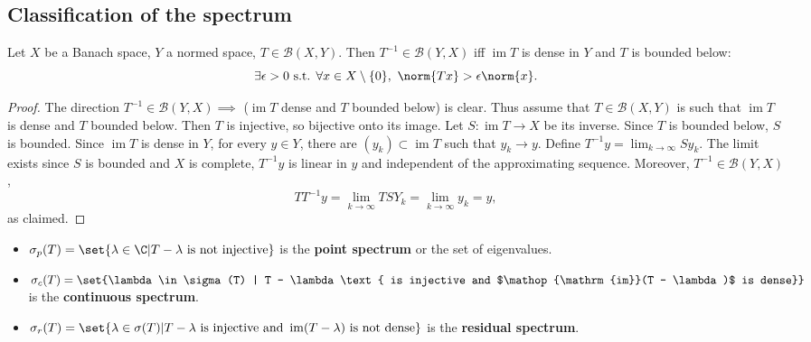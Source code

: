 \documentclass{article}
\DeclareMathOperator{\im}{im}
\begin{document}
\subsection{Classification of the spectrum}
\begin{prop}
    Let $X$ be a Banach space, $Y$ a normed space, $T \in \mathcal{B}(X,Y)$.
    Then $T^{-1} \in \mathcal{B}(Y,X)$ iff $\im T$ is dense in $Y$ and $T$ is bounded below:
    \begin{equation*}
        \exists \epsilon > 0 \text{ s.t. } \forall x \in X \setminus \{0\}, \ \norm{T x} > \epsilon \norm{x}.
    \end{equation*}
\end{prop}

\begin{proof}
    The direction $T^{-1} \in \mathcal{B}(Y, X) \implies$ ($\im T$ dense and $T$ bounded below) is clear.
    Thus assume that $T \in \mathcal{B}(X, Y)$ is such that $\im T$ is dense and $T$ bounded below.
    Then $T$ is injective, so bijective onto its image.
    Let $S: \im T \to X$ be its inverse.
    Since $T$ is bounded below, $S$ is bounded.
    Since $\im T$ is dense in $Y$, for every $y \in Y$, there are $(y_k) \subset \im T$ such that $y_k \to y$.
    Define $T^{-1} y = \lim_{k \to \infty} Sy_k$.
    The limit exists since $S$ is bounded and $X$ is complete, $T^{-1} y$ is linear in $y$ and independent of the approximating sequence.
    Moreover, $T^{-1} \in \mathcal{B}(Y, X)$,
    \begin{equation*}
        T T^{-1} y = \lim_{k \to \infty} T S Y_k = \lim_{k \to \infty} y_k = y,
    \end{equation*}
    as claimed.
\end{proof}

\begin{defi}
    \begin{itemize}
        \item $\sigma_p(T) = \set{\lambda \in \C | T - \lambda \text{ is not injective}}$ is the \textbf{point spectrum} or the set of eigenvalues.
        \item $\sigma_c(T) = \set{\lambda \in \sigma(T) | T - \lambda \text{ is injective and $\im (T - \lambda)$ is dense}}$ is the \textbf{continuous spectrum}.
        \item $\sigma_r(T) = \set{\lambda \in \sigma(T) | T - \lambda \text{ is injective and } \im(T - \lambda) \text{ is not dense}}$ is the \textbf{residual spectrum}.
    \end{itemize}
\end{defi}
\end{document}
